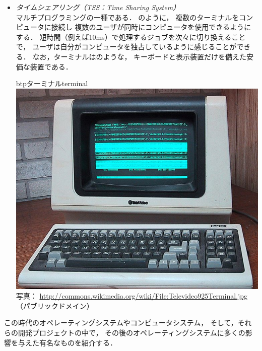 \begin{itemize}
\item \emph{タイムシェアリング（TSS：Time Sharing System）} \\
  マルチプログラミングの一種である．
  のように，
  複数のターミナルをコンピュータに接続し
  複数のユーザが同時にコンピュータを使用できるようにする．
  短時間（例えば10ms）で処理するジョブを次々に切り換えることで，
  ユーザは自分がコンピュータを独占しているように感じることができる．
  なお，ターミナルはのような，
  キーボードと表示装置だけを備えた安価な装置である．

  \begin{myfig}{btp}{ターミナル}{terminal}
    \includegraphics[scale=0.25]
     {Photo/724px-Televideo925Terminal.jpeg}\\
     {\small 写真：
       \url{http://commons.wikimedia.org/wiki/File:Televideo925Terminal.jpg}
       （パブリックドメイン）}
  \end{myfig}
\end{itemize}

この時代のオペレーティングシステムやコンピュータシステム，
そして，それらの開発プロジェクトの中で，
その後のオペレーティングシステムに多くの影響を与えた有名なものを紹介する．

